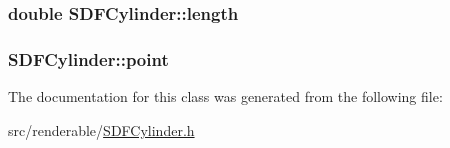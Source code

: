 \subsubsection[{\texorpdfstring{length}{length}}]{\setlength{\rightskip}{0pt plus 5cm}double S\+D\+F\+Cylinder\+::length\hspace{0.3cm}{\ttfamily [private]}}\hypertarget{classSDFCylinder_aae02d54259ddf572cd2b87c427dc1b08}{}\label{classSDFCylinder_aae02d54259ddf572cd2b87c427dc1b08}
\subsubsection[{\texorpdfstring{point}{point}}]{ S\+D\+F\+Cylinder\+::point\hspace{0.3cm}{\ttfamily [private]}}\hypertarget{classSDFCylinder_ae0ea9ff844cc30adf006fdc8315c9d17}{}\label{classSDFCylinder_ae0ea9ff844cc30adf006fdc8315c9d17}


The documentation for this class was generated from the following file\+:\begin{DoxyCompactItemize}
\item 
src/renderable/\hyperlink{SDFCylinder_8h}{S\+D\+F\+Cylinder.\+h}\end{DoxyCompactItemize}
